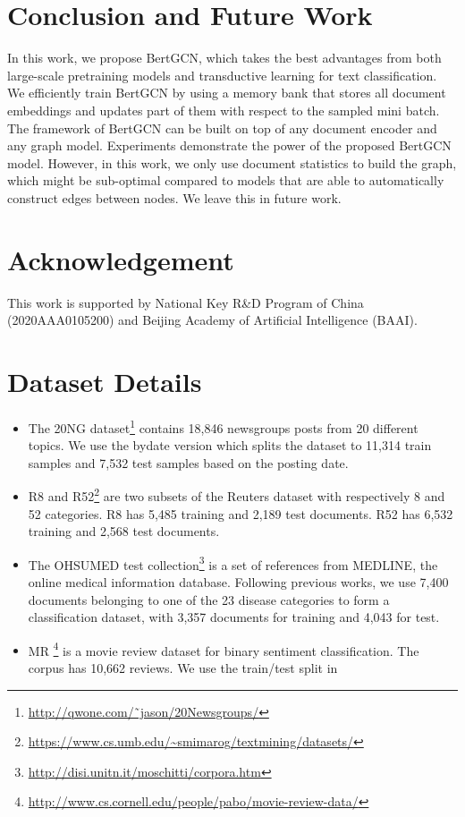 \documentclass[11pt,a4paper]{article}
\begin{document}
\section{Conclusion and Future Work}
In this work, we propose BertGCN, which takes the best advantages from both large-scale pretraining models and transductive learning for text classification. We efficiently train BertGCN by using a memory bank that stores all document embeddings and updates part of them with respect to the sampled mini batch. 
The framework of BertGCN can be built on top of any document encoder and any graph model. 
Experiments demonstrate the power of the proposed BertGCN model. However, in this work, we only use document statistics to build the graph, which might be sub-optimal compared to models that are able to automatically construct edges between nodes. We leave this in future work.

\section*{Acknowledgement}
This work is supported by National Key R\&D Program of China (2020AAA0105200) and Beijing Academy of Artificial Intelligence (BAAI).




\appendix
\section{Dataset Details}
\begin{itemize}
    \item The 20NG dataset\footnote{\url{http://qwone.com/˜jason/20Newsgroups/}} contains 18,846 newsgroups posts from 20 different topics. We use the bydate version which splits the dataset to 11,314 train samples and 7,532 test samples based on the posting date.
    \item R8 and R52\footnote{\url{https://www.cs.umb.edu/~smimarog/textmining/datasets/}} are two subsets of the Reuters dataset with respectively 8 and 52 categories. R8 has 5,485 training and 2,189 test documents. R52 has 6,532 training and 2,568 test documents.
    \item The OHSUMED test collection\footnote{\url{http://disi.unitn.it/moschitti/corpora.htm}} is a set of references from MEDLINE, the online medical information database. Following previous works,  we use 7,400 documents belonging to one of the 23 disease categories to form a classification dataset, with 3,357 documents for training and 4,043 for test.
    \item MR \citep{pang-lee-2005-seeing}\footnote{\url{http://www.cs.cornell.edu/people/pabo/movie-review-data/}} is a movie review dataset for binary sentiment classification. The corpus has 10,662 reviews. We use the train/test split in \citet{tang2015pte}
\end{itemize}
\end{document}
